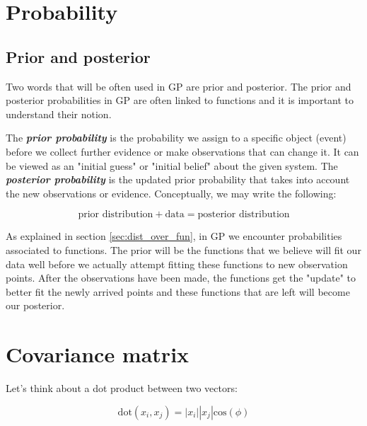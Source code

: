 \documentclass[10pt,twocolumn]{article}
\begin{document}
\section{Probability}

\subsection{Prior and posterior}

Two words that will be often used in GP are prior and posterior. The prior and posterior probabilities in GP are often linked to functions and it is important to understand their notion. 

The \textbf{\textit{prior probability}} is the probability we assign to a specific object (event) before we collect further evidence or make observations that can change it. It can be viewed as an "initial guess" or "initial belief" about the given system. The \textbf{\textit{posterior probability}} is the updated prior probability that takes into account the new observations or evidence. Conceptually, we may write the following:

\begin{equation}
\text{prior distribution} + \text{data} = \text{posterior distribution}
\end{equation}

As explained in section \ref{sec:dist_over_fun}, in GP we encounter probabilities associated to functions. The prior will be the functions that we believe will fit our data well before we actually attempt fitting these functions to new observation points. After the observations have been made, the functions get the "update" to better fit the newly arrived points and these functions that are left will become our posterior.




\section{Covariance matrix}

Let's think about a dot product between two vectors:

\begin{equation}
\text{dot}(x_i, x_j) = |x_i| |x_j| \text{cos}(\phi)
\end{equation}
\end{document}
